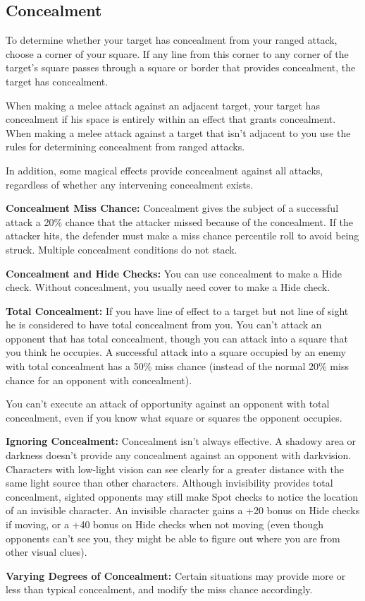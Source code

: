 \subsection{Concealment}
To determine whether your target has concealment from your ranged attack, choose a corner of your square. If any line from this corner to any corner of the target's square passes through a square or border that provides concealment, the target has concealment.

When making a melee attack against an adjacent target, your target has concealment if his space is entirely within an effect that grants concealment. When making a melee attack against a target that isn't adjacent to you use the rules for determining concealment from ranged attacks.

In addition, some magical effects provide concealment against all attacks, regardless of whether any intervening concealment exists.

\textbf{Concealment Miss Chance:} Concealment gives the subject of a successful attack a 20\% chance that the attacker missed because of the concealment. If the attacker hits, the defender must make a miss chance percentile roll to avoid being struck. Multiple concealment conditions do not stack.

\textbf{Concealment and Hide Checks:} You can use concealment to make a Hide check. Without concealment, you usually need cover to make a Hide check.

\textbf{Total Concealment:} If you have line of effect to a target but not line of sight he is considered to have total concealment from you. You can't attack an opponent that has total concealment, though you can attack into a square that you think he occupies. A successful attack into a square occupied by an enemy with total concealment has a 50\% miss chance (instead of the normal 20\% miss chance for an opponent with concealment).

You can't execute an attack of opportunity against an opponent with total concealment, even if you know what square or squares the opponent occupies.

\textbf{Ignoring Concealment:} Concealment isn't always effective. A shadowy area or darkness doesn't provide any concealment against an opponent with darkvision. Characters with low-light vision can see clearly for a greater distance with the same light source than other characters. Although invisibility provides total concealment, sighted opponents may still make Spot checks to notice the location of an invisible character. An invisible character gains a +20 bonus on Hide checks if moving, or a +40 bonus on Hide checks when not moving (even though opponents can't see you, they might be able to figure out where you are from other visual clues).

\textbf{Varying Degrees of Concealment:} Certain situations may provide more or less than typical concealment, and modify the miss chance accordingly.